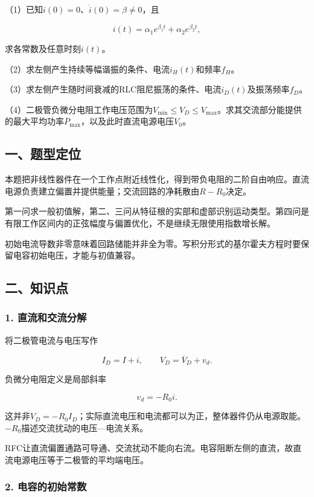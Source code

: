 \documentclass[12pt,a4paper,fontset=fandol]{ctexart}
\begin{document}
（1）已知\(i(0)=0\)、\(\dot i(0)=\beta\neq0\)，且

\[
i(t)=\alpha_1e^{\beta_1t}+\alpha_2e^{\beta_2t},
\]

求各常数及任意时刻\(i(t)\)。

（2）求左侧产生持续等幅谐振的条件、电流\(i_H(t)\)和频率\(f_H\)。

（3）求左侧产生随时间衰减的RLC阻尼振荡的条件、电流\(i_D(t)\)及振荡频率\(f_D\)。

（4）二极管负微分电阻工作电压范围为\(V_{\min}\leq V_D\leq V_{\max}\)。求其交流部分能提供的最大平均功率\(\overline P_{\max}\)，以及此时直流电源电压\(V_0\)。

\subsection{一、题型定位}\label{ux4e00ux9898ux578bux5b9aux4f4d-2}

本题把非线性器件在一个工作点附近线性化，得到带负电阻的二阶自由响应。直流电源负责建立偏置并提供能量；交流回路的净耗散由\(R-R_0\)决定。

第一问求一般初值解，第二、三问从特征根的实部和虚部识别运动类型。第四问是有限工作区间内的正弦幅度与偏置优化，不是继续无限使用指数增长解。

初始电流导数非零意味着回路储能并非全为零。写积分形式的基尔霍夫方程时要保留电容初始电压，才能与初值兼容。

\subsection{二、知识点}\label{ux4e8cux77e5ux8bc6ux70b9-2}

\subsubsection{1.
直流和交流分解}\label{ux76f4ux6d41ux548cux4ea4ux6d41ux5206ux89e3}

将二极管电流与电压写作

\[
I_D=I+i,\qquad V_D=\overline V_D+v_d.
\]

负微分电阻定义是局部斜率

\[
v_d=-R_0i.
\]

这并非\(V_D=-R_0I_D\)；实际直流电压和电流都可以为正，整体器件仍从电源取能。\(-R_0\)描述交流扰动的电压---电流关系。

RFC让直流偏置通路可导通、交流扰动不能向右流。电容阻断左侧的直流，故直流电源电压等于二极管的平均端电压。

\subsubsection{2.
电容的初始常数}\label{ux7535ux5bb9ux7684ux521dux59cbux5e38ux6570}
\end{document}
